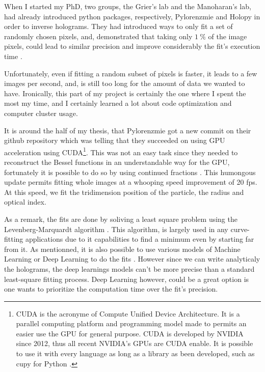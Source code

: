 When I started my PhD, two groups, the Grier's lab and the Manoharan's lab, had already introduced python packages, respectively, Pylorenzmie and Holopy in order to inverse holograms. They had introduced ways to only fit a set of randomly chosen pixels, and, demonstrated that taking only $1~\%$ of the image pixels, could lead to similar precision and improve considerably the fit's execution time \cite{dimiduk_random-subset_2014}.
 
 Unfortunately, even if fitting  a random subset of pixels is faster, it leads to a few images per second, and, is still too long for the amount of data we wanted to have. Ironically, this part of my project is certainly the one where I spent the most my time, and I certainly learned a lot about code optimization and computer cluster usage. 
 
 It is around the half of my thesis, that Pylorenzmie got a new commit on their github repository which was telling that they succeeded on using GPU acceleration using CUDA\footnote{CUDA is the acronyme of Compute Unified Device Architecture. It is a parallel computing platform and programming model made to permits an easier use the GPU for general purpose. CUDA is developed by NVIDIA since 2012, thus all recent NVIDIA's GPUs are CUDA enable. It is possible to use it with every language as long as a library as been developed, such as cupy for Python \href{https://github.com/cupy/cupy}{\faGithub}.}. This was not an easy task since they needed to reconstruct the Bessel functions in an understandable way for the GPU, fortunately it is possible to do so by using continued fractions \cite{lentz_generating_1976}. This humongous update permits fitting whole images at a whooping speed improvement of 20 fps. At this speed, we fit the tridimension position of the particle, the radius and optical index. 
 
 As a remark, the fits are done by soliving a least square problem using the Levenberg-Marquardt algorithm \cite{more_levenberg-marquardt_1978}. This algorithm, is largely used in any curve-fitting applications due to it capabilities to find a minimum even by starting far from it. As mentionned, it is also possible to use various models of Machine Learning or Deep Learning to do the fits \cite{altman_catch_2020}. However since we can write analyticaly the holograms, the deep learnings models can't be more precise than a standard least-square fitting process. Deep Learning however, could be a great option is one wants to prioritize the computation time over the fit's precision.
 
